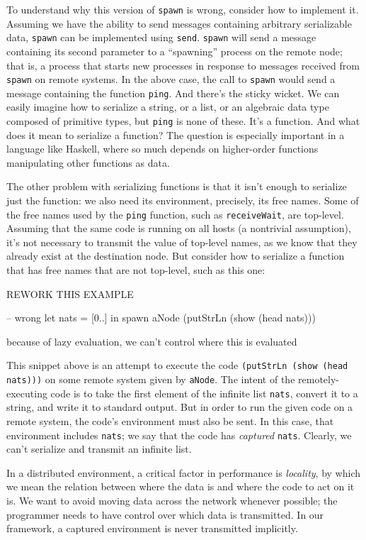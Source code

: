 \documentclass[preprint]{sigplanconf}
\begin{document}
To understand why this version of \texttt{spawn} is wrong, consider how to implement it. Assuming we have the ability to send messages containing arbitrary serializable data, \texttt{spawn} can be implemented using \texttt{send}.  \texttt{spawn} will send a message containing its second parameter to a ``spawning'' process on the remote node; that is, a process that starts new processes in response to messages received from \texttt{spawn} on remote systems. In the above case, the call to \texttt{spawn} would send a message containing the function \texttt{ping}. And there's the sticky wicket. We can easily imagine how to serialize a string, or a list, or an algebraic data type composed of primitive types, but \texttt{ping} is none of these. It's a function. And what does it mean to serialize a function? The question is especially important in a language like Haskell, where so much depends on higher-order functions manipulating other functions as data.

The other problem with serializing functions is that it isn't enough to serialize just the function: we also need its environment, precisely, its free names. Some of the free names used by the \texttt{ping} function, such as \texttt{receiveWait}, are top-level. Assuming that the same code is running on all hosts (a nontrivial assumption), it's not necessary to transmit the value of top-level names, as we know that they already exist at the destination node. But consider how to serialize a function that has free names that are not top-level, such as this one:

REWORK THIS EXAMPLE
\begin{code}
-- wrong
let nats = [0..]
 in spawn aNode (putStrLn (show (head nats))) 
\end{code}

because of lazy evaluation, we can't control where this is evaluated

This snippet above is an attempt to execute the code \lstinline!(putStrLn (show (head nats)))! on some remote system given by \texttt{aNode}. The intent of the remotely-executing code is to take the first element of the infinite list \texttt{nats}, convert it to a string, and write it to standard output. But in order to run the given code on a remote system, the code's environment must also be sent. In this case, that environment includes \texttt{nats}; we say that the code has {\em captured} \texttt{nats}. Clearly, we can't serialize and transmit an infinite list.

In a distributed environment, a critical factor in performance is {\em locality}, by which we mean the relation between where the data is and where the code to act on it is. We want to avoid moving data across the network whenever possible; the programmer needs to have control over which data is transmitted. In our framework, a captured environment is never transmitted implicitly.
\end{document}
